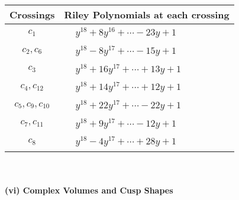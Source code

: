 \documentclass[1p]{elsarticle_modified}
\theoremstyle{definition}
\begin{document}
\begin{tabular}{m{50pt}|m{274pt}}
Crossings & \hspace{64pt}Riley Polynomials at each crossing \\
\hline $$\begin{aligned}c_{1}\end{aligned}$$&$\begin{aligned}
&y^{18}+8 y^{16}+\cdots-23 y+1
\end{aligned}$\\
\hline $$\begin{aligned}c_{2},c_{6}\end{aligned}$$&$\begin{aligned}
&y^{18}-8 y^{17}+\cdots-15 y+1
\end{aligned}$\\
\hline $$\begin{aligned}c_{3}\end{aligned}$$&$\begin{aligned}
&y^{18}+16 y^{17}+\cdots+13 y+1
\end{aligned}$\\
\hline $$\begin{aligned}c_{4},c_{12}\end{aligned}$$&$\begin{aligned}
&y^{18}+14 y^{17}+\cdots+12 y+1
\end{aligned}$\\
\hline $$\begin{aligned}c_{5},c_{9},c_{10}\end{aligned}$$&$\begin{aligned}
&y^{18}+22 y^{17}+\cdots-22 y+1
\end{aligned}$\\
\hline $$\begin{aligned}c_{7},c_{11}\end{aligned}$$&$\begin{aligned}
&y^{18}+9 y^{17}+\cdots-12 y+1
\end{aligned}$\\
\hline $$\begin{aligned}c_{8}\end{aligned}$$&$\begin{aligned}
&y^{18}-4 y^{17}+\cdots+28 y+1
\end{aligned}$\\
\hline
\end{tabular}\\~\\
\newpage\flushleft \textbf{(vi) Complex Volumes and Cusp Shapes}
\end{document}
